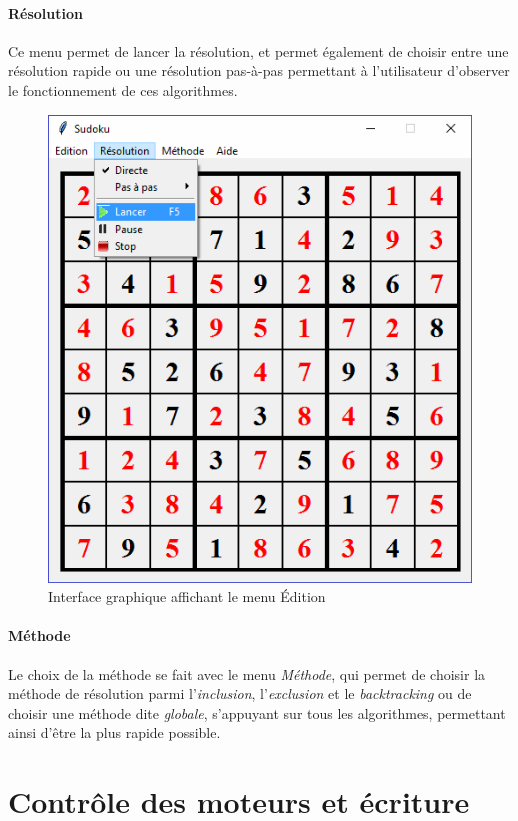 \documentclass[12pt,a4paper]{report}
\begin{document}
\paragraph{Résolution}Ce menu permet de lancer la résolution, et permet également de choisir entre une résolution rapide ou une résolution pas-à-pas permettant à l'utilisateur d'observer le fonctionnement de ces algorithmes.

\begin{figure}[!h]
 \center
 \includegraphics[scale=0.55]{../pictures/Sudoku_resolution}
 \caption{Interface graphique affichant le menu Édition}
\end{figure}

\paragraph{Méthode}Le choix de la méthode se fait avec le menu \emph{Méthode}, qui permet de choisir la méthode de résolution parmi l'\emph{inclusion}, l'\emph{exclusion} et le \emph{backtracking} ou de choisir une méthode dite \emph{globale}, s'appuyant sur tous les algorithmes, permettant ainsi d'être la plus rapide possible.

\section{Contrôle des moteurs et écriture}
\end{document}
